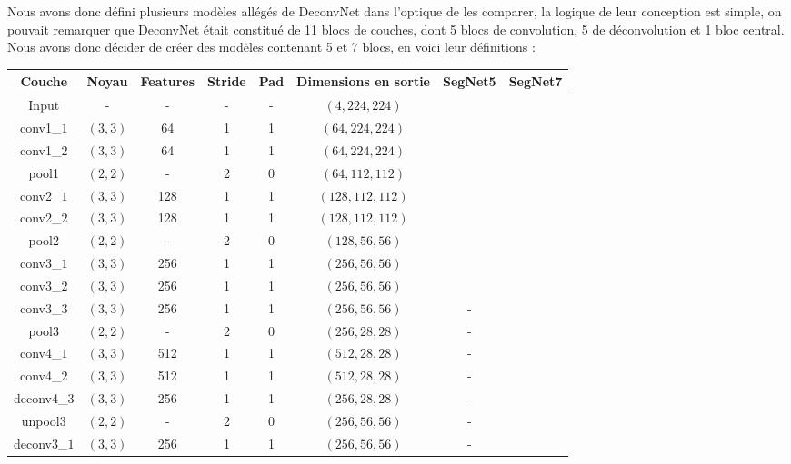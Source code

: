 \documentclass[a4paper, 11pt]{report}
\begin{document}
Nous avons donc défini plusieurs modèles allégés de DeconvNet dans l'optique de les comparer, la logique de leur conception est simple, on pouvait remarquer que DeconvNet était constitué de 11 blocs de couches, dont 5 blocs de convolution, 5 de déconvolution et 1 bloc central.
Nous avons donc décider de créer des modèles contenant 5 et 7 blocs, en voici leur définitions :
\begin{center}
	\begin{tabular}{|c|c|c|c|c|c|c|c|}
	\hline 
	Couche & Noyau & Features & Stride & Pad & Dimensions en sortie & SegNet5 & SegNet7\\ 
	\hline 
	Input & - & - & - & - & $(4, 224, 224)$ & \checkmark & \checkmark \\ 
	\hline 
	conv1\_$1$ & $(3, 3)$ & 64 & 1 & 1 & $(64, 224, 224)$ & \checkmark & \checkmark \\
	\hline 
	conv1\_$2$ & $(3, 3)$ & 64 & 1 & 1 & $(64, 224, 224)$ & \checkmark & \checkmark \\
	\hline 
	pool1 & $(2, 2)$ & - & 2 & 0 & $(64, 112, 112)$ & \checkmark & \checkmark \\
	\hline 
	conv2\_$1$ & $(3, 3)$ & 128 & 1 & 1 & $(128, 112, 112)$ & \checkmark & \checkmark \\
	\hline 
	conv2\_$2$ & $(3, 3)$ & 128 & 1 & 1 & $(128, 112, 112)$ & \checkmark & \checkmark \\
	\hline 
	pool2 & $(2, 2)$ & - & 2 & 0 & $(128, 56, 56)$ & \checkmark & \checkmark \\
	\hline 
	conv3\_$1$ & $(3, 3)$ & 256 & 1 & 1 & $(256, 56, 56)$ & \checkmark & \checkmark \\
	\hline 
	conv3\_$2$ & $(3, 3)$ & 256 & 1 & 1 & $(256, 56, 56)$ & \checkmark & \checkmark \\
	\hline 
	conv3\_$3$ & $(3, 3)$ & 256 & 1 & 1 & $(256, 56, 56)$ & - & \checkmark \\
	\hline 
	pool3 & $(2, 2)$ & - & 2 & 0 & $(256, 28, 28)$ & - & \checkmark \\
	\hline 
	conv4\_$1$ & $(3, 3)$ & 512 & 1 & 1 & $(512, 28, 28)$ & - & \checkmark \\
	\hline 
	conv4\_$2$ & $(3, 3)$ & 512 & 1 & 1 & $(512, 28, 28)$ & - & \checkmark \\
	\hline
	deconv4\_$3$ & $(3, 3)$ & 256 & 1 & 1 & $(256, 28, 28)$ & - & \checkmark \\
	\hline
	unpool3 & $(2, 2)$ & - & 2 & 0 & $(256, 56, 56)$ & - & \checkmark \\
	\hline
	deconv3\_$1$ & $(3, 3)$ & 256 & 1 & 1 & $(256, 56, 56)$ & - & \checkmark \\

\end{tabular}
\end{center}
\end{document}
